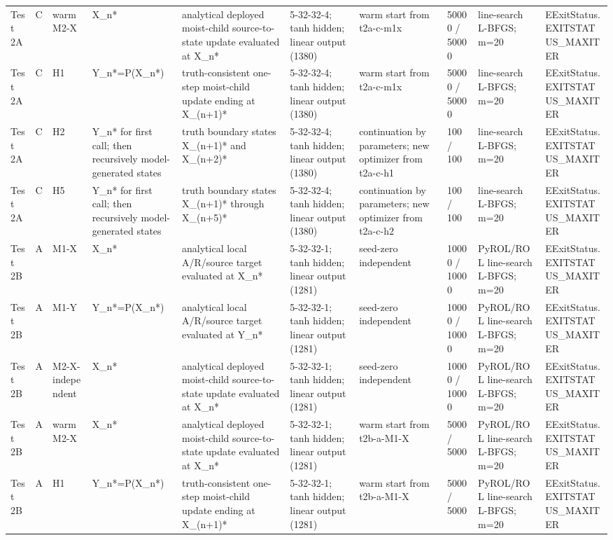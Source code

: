 \begin{tabular}{llllllllll}
Test 2A & C & warm M2-X & X\_n* & analytical deployed moist-child source-to-state update evaluated at X\_n* & 5-32-32-4; tanh hidden; linear output (1380) & warm start from t2a-c-m1x & 50000 / 50000 & line-search L-BFGS; m=20 & EExitStatus.EXITSTATUS\_MAXITER \\
Test 2A & C & H1 & Y\_n*=P(X\_n*) & truth-consistent one-step moist-child update ending at X\_(n+1)* & 5-32-32-4; tanh hidden; linear output (1380) & warm start from t2a-c-m1x & 50000 / 50000 & line-search L-BFGS; m=20 & EExitStatus.EXITSTATUS\_MAXITER \\
Test 2A & C & H2 & Y\_n* for first call; then recursively model-generated states & truth boundary states X\_(n+1)* and X\_(n+2)* & 5-32-32-4; tanh hidden; linear output (1380) & continuation by parameters; new optimizer from t2a-c-h1 & 100 / 100 & line-search L-BFGS; m=20 & EExitStatus.EXITSTATUS\_MAXITER \\
Test 2A & C & H5 & Y\_n* for first call; then recursively model-generated states & truth boundary states X\_(n+1)* through X\_(n+5)* & 5-32-32-4; tanh hidden; linear output (1380) & continuation by parameters; new optimizer from t2a-c-h2 & 100 / 100 & line-search L-BFGS; m=20 & EExitStatus.EXITSTATUS\_MAXITER \\
Test 2B & A & M1-X & X\_n* & analytical local A/R/source target evaluated at X\_n* & 5-32-32-1; tanh hidden; linear output (1281) & seed-zero independent & 10000 / 10000 & PyROL/ROL line-search L-BFGS; m=20 & EExitStatus.EXITSTATUS\_MAXITER \\
Test 2B & A & M1-Y & Y\_n*=P(X\_n*) & analytical local A/R/source target evaluated at Y\_n* & 5-32-32-1; tanh hidden; linear output (1281) & seed-zero independent & 10000 / 10000 & PyROL/ROL line-search L-BFGS; m=20 & EExitStatus.EXITSTATUS\_MAXITER \\
Test 2B & A & M2-X-independent & X\_n* & analytical deployed moist-child source-to-state update evaluated at X\_n* & 5-32-32-1; tanh hidden; linear output (1281) & seed-zero independent & 10000 / 10000 & PyROL/ROL line-search L-BFGS; m=20 & EExitStatus.EXITSTATUS\_MAXITER \\
Test 2B & A & warm M2-X & X\_n* & analytical deployed moist-child source-to-state update evaluated at X\_n* & 5-32-32-1; tanh hidden; linear output (1281) & warm start from t2b-a-M1-X & 5000 / 5000 & PyROL/ROL line-search L-BFGS; m=20 & EExitStatus.EXITSTATUS\_MAXITER \\
Test 2B & A & H1 & Y\_n*=P(X\_n*) & truth-consistent one-step moist-child update ending at X\_(n+1)* & 5-32-32-1; tanh hidden; linear output (1281) & warm start from t2b-a-M1-X & 5000 / 5000 & PyROL/ROL line-search L-BFGS; m=20 & EExitStatus.EXITSTATUS\_MAXITER \\

\end{tabular}
